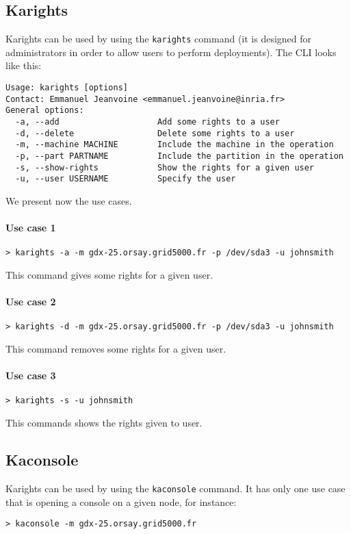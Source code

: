 \documentclass[a4wide,10pt,oneside]{book}
\begin{document}
\subsection{Karights}\label{sec:karights}
Karights can be used by using the \texttt{karights} command (it is designed for administrators in order to allow users to perform deployments). The CLI looks like this:
\begin{small}
\begin{verbatim}
Usage: karights [options]
Contact: Emmanuel Jeanvoine <emmanuel.jeanvoine@inria.fr>
General options:
  -a, --add                    Add some rights to a user
  -d, --delete                 Delete some rights to a user
  -m, --machine MACHINE        Include the machine in the operation
  -p, --part PARTNAME          Include the partition in the operation
  -s, --show-rights            Show the rights for a given user
  -u, --user USERNAME          Specify the user
\end{verbatim}
\end{small}

We present now the use cases.
\paragraph{Use case 1}
\begin{verbatim}
> karights -a -m gdx-25.orsay.grid5000.fr -p /dev/sda3 -u johnsmith
\end{verbatim}
This command gives some rights for a given user.

\paragraph{Use case 2}
\begin{verbatim}
> karights -d -m gdx-25.orsay.grid5000.fr -p /dev/sda3 -u johnsmith
\end{verbatim}
This command removes some rights for a given user.

\paragraph{Use case 3}
\begin{verbatim}
> karights -s -u johnsmith
\end{verbatim}
This commands shows the rights given to user.

\subsection{Kaconsole}\label{sec:kaconsole}
Karights can be used by using the \texttt{kaconsole} command. It has only one use case that is opening a console on a given node, for instance:
\begin{verbatim}
> kaconsole -m gdx-25.orsay.grid5000.fr
\end{verbatim}
\end{document}

